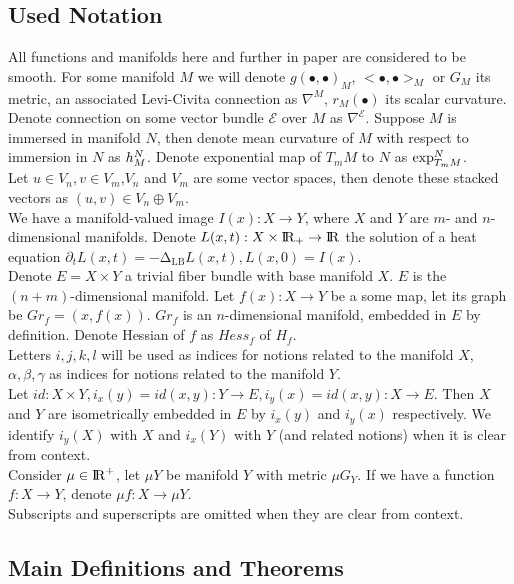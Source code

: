 \documentclass{llncs}
\newcommand{\LaplaceBeltrami}{\mathrm{\Delta_{{LB}}}}
\newcommand{\partderiv}[2]{\partial_{#2} {#1}}
\newcommand{\toreal}{\rightarrow\bbbr}
\newcommand{\CovariantDiffManif}[1]{\nabla^{#1}}
\newcommand{\TangentSpaceArg}[2]{{T_{#2}}{#1}}
\newcommand {\bigeps}{\mathcal{E}}
\begin{document}
\subsection{Used Notation}
All functions and manifolds here and further in paper are considered to be smooth. For some manifold $M$ we will denote $g(∙,∙)_{M}$, $<∙,∙>_{M}$ or $G_M$ its metric, an associated Levi-Civita connection as $\CovariantDiffManif{M}$, $r_M(∙)$ its scalar curvature. Denote connection on some vector bundle $\bigeps$ over $M$ as $\CovariantDiffManif{\bigeps}$. Suppose $M$ is immersed in manifold $N$, then denote mean curvature of $M$ with respect to immersion in $N$ as $\tensor*{h}{^{N}_{M}}$. Denote exponential map of $\TangentSpaceArg{M}{m}$ to $N$ as $\tensor*{\exp}{^N_{\TangentSpaceArg{M}{m}}}$.
\\
Let $u \in V_n, v \in V_m$,$V_n$ and $V_m$ are some vector spaces, then denote these stacked vectors as $(u,v) \in V_n\oplus V_m$.
\\ 
We have a manifold-valued image $I(x):X \to Y$, where $X$ and $Y$ are $m$- and $n$-dimensional manifolds. Denote $L(x,t):X\times \bbbr_{+} \toreal$ the solution of a heat equation $\partderiv{L(x, t)}{t}=-\LaplaceBeltrami{ L(x, t)},L(x, 0)=I(x)$. 
\\
Denote $E=X\times Y$ a  trivial fiber bundle with base manifold $X$. $E$ is the $(n+m)$-dimensional manifold. Let $f(x):X\to Y$ be a some map, let its graph be $Gr_f=(x,f(x))$. $Gr_f$ is an $n$-dimensional manifold, embedded in $E$ by definition. Denote Hessian of $f$ as $Hess_f$ of $H_f$.
\\
Letters $i,j,k,l$ will be used as indices for notions related to the manifold $X$, $\alpha, \beta, \gamma$ as indices for notions related to the manifold $Y$.
\\
Let $id:X\times Y, i_x(y)=id(x, y):Y\to E, i_y(x)=id(x, y):X\to E$. Then $X$ and $Y$ are isometrically embedded in $E$ by $i_x(y)$ and $i_y(x)$ respectively. We identify $i_y(X)$ with $X$ and $i_x(Y)$ with $Y$ (and related notions) when it is clear from context.
\\
Consider $\mu \in {\rm I\!R}^{+}$, let $\mu Y$ be manifold $Y$ with metric $\mu G_Y$. If we have a function $f:X\to Y$, denote $\mu f:X\to \mu Y$.
\\
Subscripts and superscripts are omitted when they are clear from context.

\subsection{Main Definitions and Theorems}
\end{document}

